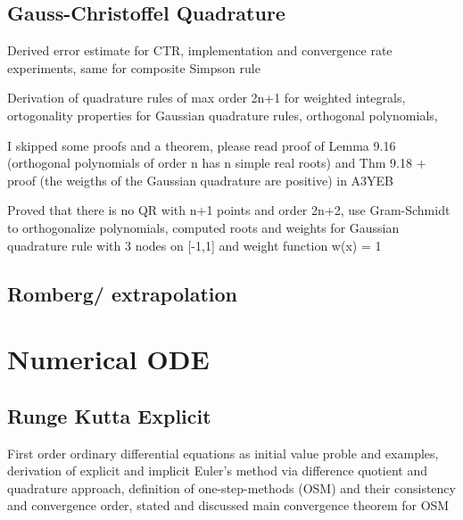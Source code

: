 \documentclass{article}
\theoremstyle{remark}
\begin{document}
\subsection{Gauss-Christoffel Quadrature}%
\label{sub:gauss_christoffel_quadrature}
\begin{tcolorbox}
  Derived error estimate for CTR, implementation and convergence rate experiments, same for composite Simpson rule	
\end{tcolorbox}

\begin{tcolorbox}
  Derivation of quadrature rules of max order 2n+1 for weighted integrals, ortogonality properties for Gaussian quadrature rules, orthogonal polynomials,

I skipped some proofs and a theorem, please read proof of Lemma 9.16 (orthogonal polynomials of order n has n simple real roots)  and Thm 9.18 + proof (the weigths of the Gaussian quadrature are positive) in A3YEB
\end{tcolorbox}

\begin{tcolorbox}
  Proved that there is no QR with n+1 points and order 2n+2, use Gram-Schmidt to orthogonalize polynomials, computed roots and weights for Gaussian quadrature rule with 3 nodes on [-1,1] and weight function w(x) = 1


\end{tcolorbox}

\subsection{Romberg/ extrapolation}%
\label{sub:romberg_extrapolation}

\newpage
\section{Numerical ODE}%
\label{sec:numerical_ode}

\subsection{Runge Kutta Explicit }%
\label{sub:runge_kutta_explicit_}

\begin{tcolorbox}
  	First order ordinary differential equations as initial value proble and examples, derivation of explicit and implicit Euler's method via difference quotient and quadrature approach, definition of  one-step-methods (OSM) and their consistency and convergence order, stated and discussed main convergence theorem for OSM
\end{tcolorbox}
 
\end{document}
